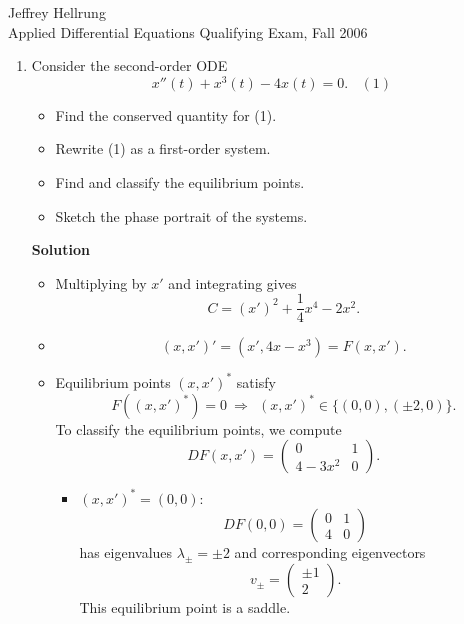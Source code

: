 \documentclass{article}
\begin{document}
\begin{flushright}
Jeffrey Hellrung \\
Applied Differential Equations Qualifying Exam, Fall 2006 \\
\end{flushright}


\begin{enumerate}

\item Consider the second-order ODE
\[x''(t) + x^3(t) - 4 x(t) = 0. \ \ \ \ (1)\]

\begin{itemize}
\item Find the conserved quantity for (1).

\item Rewrite (1) as a first-order system.

\item Find and classify the equilibrium points.

\item Sketch the phase portrait of the systems.

\end{itemize}

{\bf Solution}

\begin{itemize}
\item Multiplying by \(x'\) and integrating gives
\[C = \left( x' \right)^2 + \frac{1}{4} x^4 - 2 x^2.\]

\item
\[(x,x')' = (x', 4 x - x^3) = F(x,x').\]

\item Equilibrium points \((x,x')^*\) satisfy
\[F((x,x')^*) = 0 \ \Rightarrow \ \ (x,x')^* \in \{(0,0), (\pm 2, 0)\}.\]
To classify the equilibrium points, we compute
\[DF(x,x') = \left( \begin{array}{cc} 0 & 1 \\ 4 - 3 x^2 & 0 \end{array} \right).\]

\begin{itemize}
\item \((x,x')^* = (0,0)\):
\[DF(0,0) = \left( \begin{array}{cc} 0 & 1 \\ 4 & 0 \end{array} \right)\]
has eigenvalues \(\lambda_{\pm} = \pm 2\) and corresponding eigenvectors
\[v_{\pm} = \left( \begin{array}{c} \pm 1 \\ 2 \end{array} \right).\]
This equilibrium point is a saddle.


\end{itemize}
\end{itemize}
\end{enumerate}
\end{document}

